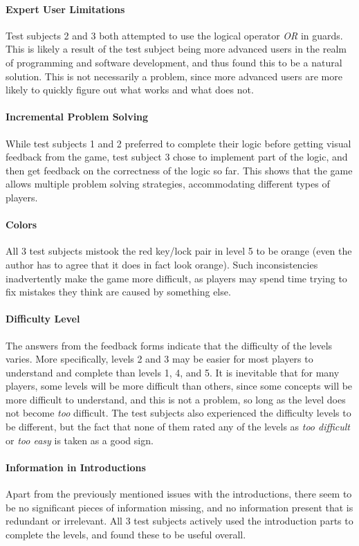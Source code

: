 \paragraph{Expert User Limitations} Test subjects 2 and 3 both attempted to use the logical operator \emph{OR} in guards. This is likely a result of the test subject being more advanced users in the realm of programming and software development, and thus found this to be a natural solution. This is not necessarily a problem, since more advanced users are more likely to quickly figure out what works and what does not.

\paragraph{Incremental Problem Solving} While test subjects 1 and 2 preferred to complete their logic before getting visual feedback from the game, test subject 3 chose to implement part of the logic, and then get feedback on the correctness of the logic so far. This shows that the game allows multiple problem solving strategies, accommodating different types of players.

\paragraph{Colors} All 3 test subjects mistook the red key/lock pair in level 5 to be orange (even the author has to agree that it does in fact look orange). Such inconsistencies inadvertently make the game more difficult, as players may spend time trying to fix mistakes they think are caused by something else.

\paragraph{Difficulty Level} The answers from the feedback forms indicate that the difficulty of the levels varies. More specifically, levels 2 and 3 may be easier for most players to understand and complete than levels 1, 4, and 5. It is inevitable that for many players, some levels will be more difficult than others, since some concepts will be more difficult to understand, and this is not a problem, so long as the level does not become \emph{too} difficult. The test subjects also experienced the difficulty levels to be different, but the fact that none of them rated any of the levels as \emph{too difficult} or \emph{too easy} is taken as a good sign.

\paragraph{Information in Introductions} Apart from the previously mentioned issues with the introductions, there seem to be no significant pieces of information missing, and no information present that is redundant or irrelevant. All 3 test subjects actively used the introduction parts to complete the levels, and found these to be useful overall.

